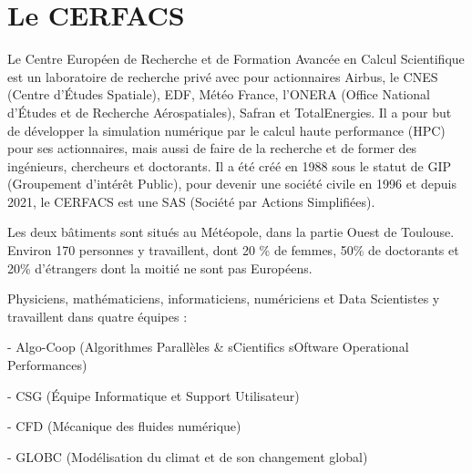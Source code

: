 \chapter{Le CERFACS}

Le Centre Européen de Recherche et de Formation Avancée en Calcul Scientifique est un laboratoire de recherche privé avec pour actionnaires Airbus, le CNES (Centre d'Études Spatiale), EDF, Météo France, l'ONERA (Office National d'Études et de Recherche Aérospatiales), Safran et TotalEnergies. Il a pour but de développer la simulation numérique par le calcul haute performance (HPC) pour ses actionnaires, mais aussi de faire de la recherche et de former des ingénieurs, chercheurs et doctorants. Il a été créé en 1988 sous le statut de GIP (Groupement d’intérêt Public), pour devenir une société civile en 1996 et depuis 2021, le CERFACS est une SAS (Société par Actions Simplifiées).

Les deux bâtiments sont situés au Météopole, dans la partie Ouest de Toulouse. Environ 170 personnes y travaillent, dont 20 \% de femmes, 50\% de doctorants et 20\% d'étrangers dont la moitié ne sont pas Européens.

Physiciens, mathématiciens, informaticiens, numériciens et Data Scientistes y travaillent dans quatre équipes :


- Algo-Coop (Algorithmes Parallèles \& sCientifics sOftware Operational Performances)

- CSG (Équipe Informatique et Support Utilisateur)

- CFD (Mécanique des fluides numérique) %

- GLOBC (Modélisation du climat et de son changement global)


